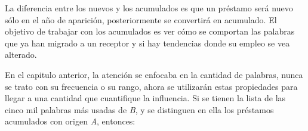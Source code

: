 La diferencia entre los nuevos y los acumulados es que un préstamo será nuevo
sólo en el año de aparición, posteriormente se convertirá en acumulado. El
objetivo  de trabajar con los acumulados es ver cómo se comportan las palabras
que ya han migrado a un receptor y si hay tendencias donde su empleo se vea
alterado.  

En el capitulo anterior, la atención se enfocaba en la cantidad de palabras,
nunca se trato con su frecuencia o su rango, ahora se utilizarán estas
propiedades  para llegar a una cantidad que cuantifique la influencia. Si se
tienen la lista de las cinco mil palabras más usadas  de \textit{B}, y se
distinguen en ella los préstamos acumulados con origen \textit{A}, entonces:


